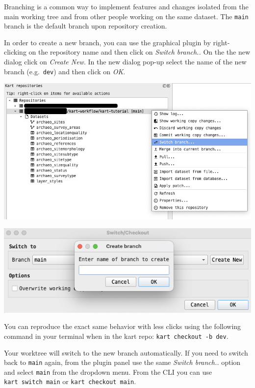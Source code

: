 \documentclass[
  letterpaper,
  DIV=11,
  numbers=noendperiod]{scrartcl}
\begin{document}
Branching is a common way to implement features and changes isolated
from the main working tree and from other people working on the same
dataset. The \texttt{main} branch is the default branch upon repository
creation.

In order to create a new branch, you can use the graphical plugin by
right-clicking on the repository name and then click on \emph{Switch
branch..} On the the new dialog click on \emph{Create New}. In the new
dialog pop-up select the name of the new branch (e.g.~\texttt{dev}) and
then click on \emph{OK}.

\begin{center}
\includegraphics{img/kart-panel-branch.png}
\end{center}

\begin{center}
\includegraphics{img/kart-panel-switch-new.png}
\end{center}

You can reproduce the exact same behavior with less clicks using the
following command in your terminal when in the kart repo:
\texttt{kart\ checkout\ -b\ dev}.

Your worktree will switch to the new branch automatically. If you need
to switch back to \texttt{main} again, from the plugin panel use the
same \emph{Switch branch..} option and select \texttt{main} from the
dropdown menu. From the CLI you can use \texttt{kart\ switch\ main} or
\texttt{kart\ checkout\ main}.
\end{document}
